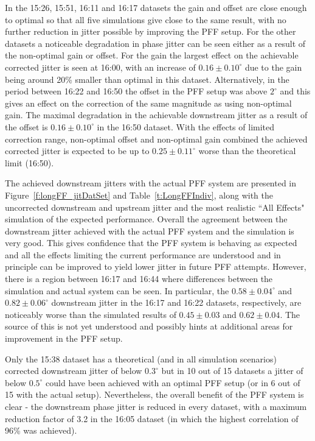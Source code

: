 In the 15:26, 15:51, 16:11 and 16:17 datasets the gain and offset are close enough to optimal so that all five simulations give close to the same result, with no further reduction in jitter possible by improving the PFF setup. 
For the other datasets a noticeable degradation in phase jitter can be seen either as a result of the non-optimal gain or offset.
For the gain the largest effect on the achievable corrected jitter is seen at 16:00, with an increase of \(0.16\pm0.10^\circ\) due to the gain being around 20\% smaller than optimal in this dataset. 
Alternatively, in the period between 16:22 and 16:50 the offset in the PFF setup was above \(2^\circ\) and this gives an effect on the correction of the same magnitude as using non-optimal gain. The maximal degradation in the achievable downstream jitter as a result of the offset is \(0.16\pm0.10^\circ\) in the 16:50 dataset. 
With the effects of limited correction range, non-optimal offset and non-optimal gain combined the achieved corrected jitter is expected to be up to \(0.25\pm0.11^\circ\) worse than the theoretical limit (16:50).%



The achieved downstream jitters with the actual PFF system are presented in Figure~\ref{f:longFF_jitDatSet} and Table~\ref{t:LongFFIndiv}, along with the uncorrected downstream and upstream jitter and the most realistic ``All Effects" simulation of the expected performance. Overall the agreement between the downstream jitter achieved with the actual PFF system and the simulation is very good. This gives confidence that the PFF system is behaving as expected and all the effects limiting the current performance are understood and in principle can be improved to yield lower jitter in future PFF attempts. However, there is a region between 16:17 and 16:44 where differences between the simulation and actual system can be seen. In particular, the \(0.58\pm0.04^\circ\) and \(0.82\pm0.06^\circ\) downstream jitter in the 16:17 and 16:22 datasets, respectively, are noticeably worse than the simulated results of \(0.45\pm0.03\) and \(0.62\pm0.04\). The source of this is not yet understood and possibly hints at additional areas for improvement in the PFF setup.

Only the 15:38 dataset has a theoretical (and in all simulation scenarios) corrected downstream jitter of below \(0.3^\circ\) but in 10 out of 15 datasets a jitter of below \(0.5^\circ\) could have been achieved with an optimal PFF setup (or in 6 out of 15 with the actual setup). Nevertheless, 
the overall benefit of the PFF system is clear - the downstream phase jitter is reduced in every dataset, with a maximum reduction factor of 3.2 in the 16:05 dataset (in which the highest correlation of 96\% was achieved).

